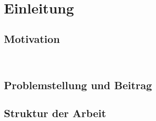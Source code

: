 %
\chapter{Einleitung}

\section{Motivation}
\blindtext ~\cite{BDSG13}

\section{Problemstellung und Beitrag}
\blindtext

\section{Struktur der Arbeit}
\blindtext
